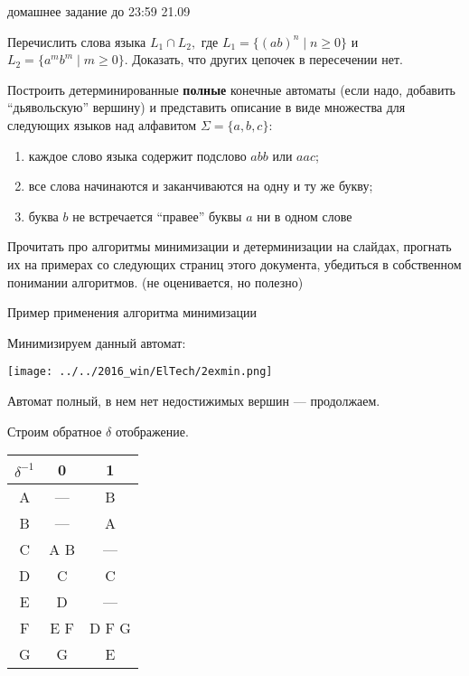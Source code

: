 \documentclass[12pt]{article}
\begin{document}

{\Large домашнее задание до 23:59 21.09}
\bigskip

\enumerate
{
  \item
  {
    Перечислить слова языка $L_1 \cap L_2,$ где $L_1 = \{ (ab)^n \mid n \geq 0 \}$ и $L_2 = \{ a^m b^m \mid m \geq 0 \}$. Доказать, что других цепочек в пересечении нет. 
  }
  \item 
  { 
    Построить детерминированные \textbf{полные} конечные автоматы (если надо, добавить ``дьявольскую'' вершину) и представить описание в виде множества для следующих языков над алфавитом $\Sigma = \{ a, b, c \}$:
    \begin{enumerate}
        \item каждое слово языка содержит подслово $abb$ или $aac$;
        \item все слова начинаются и заканчиваются на одну и ту же букву;
        \item  буква $b$ не встречается ``правее'' буквы $a$ ни в одном слове
    \end{enumerate}
  }
  \item
  {
    Прочитать про алгоритмы минимизации и детерминизации на слайдах, прогнать их на примерах со следующих страниц этого документа, убедиться в собственном понимании алгоритмов. (не оценивается, но полезно) 
  }
  
  
\newpage
\begin{center} \Large{Пример применения алгоритма минимизации}
\end{center}

\bigskip

Минимизируем данный автомат:

\begin{center} \texttt{[image: ../../2016\_win/ElTech/2exmin.png]} \end{center}

Автомат полный, в нем нет недостижимых вершин --- продолжаем.

Строим обратное $\delta$ отображение. 

\begin{tabular}{c|c|c}
$\delta^{-1}$ & 0 & 1 \\ \hline
A & --- & B \\
B & --- & A \\
C & A B & --- \\
D & C & C \\
E & D & --- \\
F & E F & D F G \\
G & G & E 
\end{tabular}

}
\end{document}

